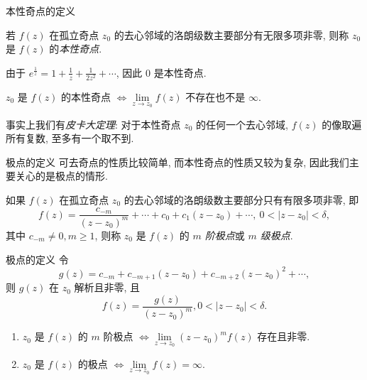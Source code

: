 \begin{frame}{本性奇点的定义}
	\onslide<+->
	\begin{definition}
		若 $f(z)$ 在孤立奇点 $z_0$ 的去心邻域的洛朗级数主要部分有无限多项非零, 则称 $z_0$ 是 $f(z)$ 的\emph{本性奇点}.
	\end{definition}
	
	\onslide<+->
	\begin{example}
		由于 $\displaystyle e^{\frac1z}=1+\frac1z+\frac1{2z^2}+\cdots$, 因此 $0$ 是本性奇点.
	\end{example}

	\onslide<+->
	\begin{theorem}
		$z_0$ 是 $f(z)$ 的本性奇点 $\iff\lim\limits_{z\to z_0}f(z)$ 不存在也不是 $\infty$.
	\end{theorem}

	\onslide<+->
	事实上我们有\emph{皮卡大定理}: 对于本性奇点 $z_0$ 的任何一个去心邻域, $f(z)$ 的像取遍所有复数, 至多有一个取不到.
\end{frame}


\begin{frame}{极点的定义}
	\onslide<+->
	可去奇点的性质比较简单, 而本性奇点的性质又较为复杂, 因此我们主要关心的是极点的情形.

	\onslide<+->
	\begin{definition}
		如果 $f(z)$ 在孤立奇点 $z_0$ 的去心邻域的洛朗级数主要部分只有有限多项非零, 即
		\[f(z)=\frac{c_{-m}}{(z-z_0)^m}+\cdots+c_0+c_1(z-z_0)+\cdots,\ 0<|z-z_0|<\delta,\]
		其中 $c_{-m}\neq 0,m\ge 1$, 则称 $z_0$ 是 $f(z)$ 的 \emph{$m$ 阶极点}或 \emph{$m$ 级极点}.
	\end{definition}
\end{frame}


\begin{frame}{极点的定义}
	\onslide<+->
	令
	\[g(z)=c_{-m}+c_{-m+1}(z-z_0)+c_{-m+2}(z-z_0)^2+\cdots,\]
	则 $g(z)$ 在 $z_0$ 解析且非零,
	\onslide<+->
	且
	\[f(z)=\dfrac{g(z)}{(z-z_0)^m},0<|z-z_0|<\delta.\]

	\onslide<+->
	\begin{theorem}
		\begin{enumerate}
			\item $z_0$ 是 $f(z)$ 的 $m$ 阶极点 $\iff\lim\limits_{z\to z_0}(z-z_0)^mf(z)$ 存在且非零.
			\item $z_0$ 是 $f(z)$ 的极点 $\iff\lim\limits_{z\to z_0}f(z)=\infty$.
		\end{enumerate}
	\end{theorem}
\end{frame}


